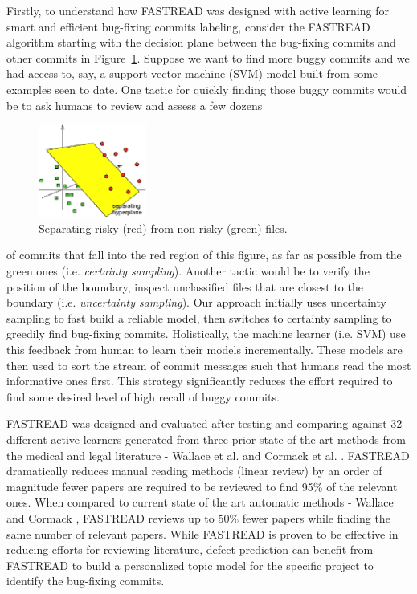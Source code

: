 \documentclass[sigconf,review, anonymous]{acmart}
\newcommand{\fig}[1]{Figure~\ref{fig:#1}}
\begin{document}
Firstly, to understand how FASTREAD was designed with active learning for smart and efficient bug-fixing commits labeling, consider the FASTREAD algorithm \cite{Yu2018} starting with the decision plane between the bug-fixing commits and other commits in \fig{svm}. Suppose we want to find more buggy commits and we had access to, say, a support vector machine (SVM) model built from some examples seen to date. 
One tactic for quickly finding those buggy commits would be to ask humans to review and assess a few dozens \begin{figure}
\vspace{-10pt}
\hspace{-12pt}
\includegraphics[width=1.4in]{svm.png}
\vspace{-5pt} \hspace{-25pt} \caption{ Separating risky (red) from  non-risky (green) files.}\label{fig:svm}
\vspace{-15pt}
\end{figure}  of commits that fall into the red region of this figure, as far as possible from the green ones (i.e. {\em certainty sampling}). Another tactic would be to verify the position of the boundary, inspect unclassified files that are closest to the boundary (i.e. {\em uncertainty sampling}). Our approach initially uses uncertainty sampling to fast build a reliable model, then switches to certainty sampling to greedily find bug-fixing commits. Holistically,  the machine learner (i.e. SVM) use this feedback from human to learn their models incrementally. These models are then used to sort the stream of commit messages such that humans read the most informative ones first. This strategy significantly reduces the effort required to find some desired level of high recall of buggy commits.

FASTREAD was designed and evaluated after testing and comparing against 32 different active learners generated from three prior state of the art methods from the medical and legal literature - Wallace et al. and Cormack et al. \cite{wallace2010active, Cormack2015Autonomy}. FASTREAD dramatically reduces manual reading methods (linear review) by an order of magnitude fewer papers are required to be reviewed to find 95\% of the relevant ones. When compared to current state of the art automatic methods - Wallace and Cormack \cite{wallace2010active, Cormack2015Autonomy}, FASTREAD reviews up to 50\% fewer papers while finding the same number of relevant papers. While FASTREAD is proven to be effective in reducing efforts for reviewing literature, defect prediction can benefit from FASTREAD to build a personalized topic model for the specific project to identify the bug-fixing commits.  
\end{document}

